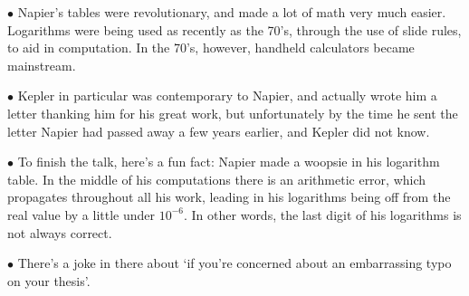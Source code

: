 \documentclass{article}
\newcommand\point[1]{\noindent \hspace{\labelsep} $\bullet$ #1 \smallskip}
\begin{document}
\point{Napier's tables were revolutionary, and made a lot of math very much easier. Logarithms were being used as recently as the 70's, through the use of slide rules, to aid in computation. In the 70's, however, handheld calculators became mainstream.}

\point{Kepler in particular was contemporary to Napier, and actually wrote him a letter thanking him for his great work, but unfortunately by the time he sent the letter Napier had passed away a few years earlier, and Kepler did not know.}

\point{To finish the talk, here's a fun fact: Napier made a woopsie in his logarithm table. In the middle of his computations there is an arithmetic error, which propagates throughout all his work, leading in his logarithms being off from the real value by a little under $10^{-6}$. In other words, the last digit of his logarithms is not always correct.}

\point{There's a joke in there about `if you're concerned about an embarrassing typo on your thesis'.}
\end{document}
